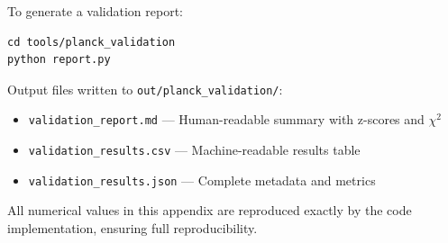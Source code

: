 To generate a validation report:
\begin{verbatim}
cd tools/planck_validation
python report.py
\end{verbatim}

Output files written to \texttt{out/planck\_validation/}:
\begin{itemize}
\item \texttt{validation\_report.md} --- Human-readable summary with z-scores and $\chi^2$
\item \texttt{validation\_results.csv} --- Machine-readable results table
\item \texttt{validation\_results.json} --- Complete metadata and metrics
\end{itemize}

All numerical values in this appendix are reproduced exactly by the code implementation, ensuring full reproducibility.
